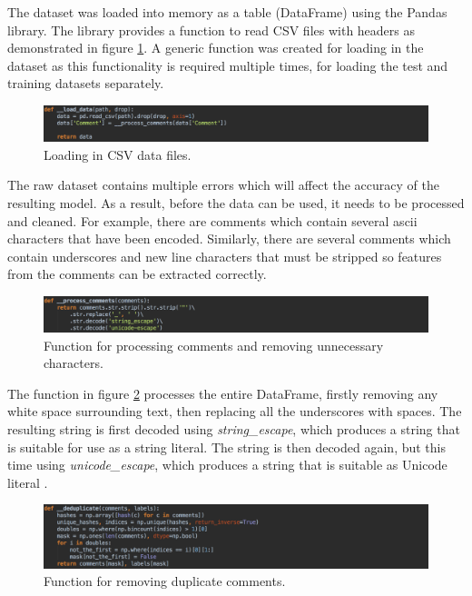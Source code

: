  The dataset was loaded into memory as a table (DataFrame) using the Pandas library. The library provides a function to read CSV files with headers as demonstrated in figure \ref{fig:AbuseDetection_LoadData}. A generic function was created for loading in the dataset as this functionality is required multiple times, for loading the test and training datasets separately.

\begin{figure}[H]
	\centering
	\includegraphics[width=\textwidth]{Images/Implementation/DataProcessing/AbuseDetection/LoadData}
	\caption{Loading in CSV data files.}
	\label{fig:AbuseDetection_LoadData}
\end{figure}

The raw dataset contains multiple errors which will affect the accuracy of the resulting model. As a result, before the data can be used, it needs to be processed and cleaned. For example, there are comments which contain several ascii characters that have been encoded. Similarly, there are several comments which contain underscores and new line characters that must be stripped so features from the comments can be extracted correctly.

\begin{figure}[H]
	\centering
	\includegraphics[width=\textwidth]{Images/Implementation/DataProcessing/AbuseDetection/ProcessComments}
	\caption{Function for processing comments and removing unnecessary characters.}
	\label{fig:AbuseDetection-ProcessComments}
\end{figure}

The function in figure \ref{fig:AbuseDetection-ProcessComments} processes the entire DataFrame, firstly removing any white space surrounding text, then replacing all the underscores with spaces. The resulting string is first decoded using \emph{string\_escape}, which produces a string that is suitable for use as a string literal. The string is then decoded again, but this time using \emph{unicode\_escape}, which produces a string that is suitable as Unicode literal \cite{Python:Codes}.

\begin{figure}[H]
	\centering
	\includegraphics[width=\textwidth]{Images/Implementation/DataProcessing/AbuseDetection/Deduplicate}
	\caption{Function for removing duplicate comments.}
	\label{fig:AbuseDetection-Deduplicate}
\end{figure}

